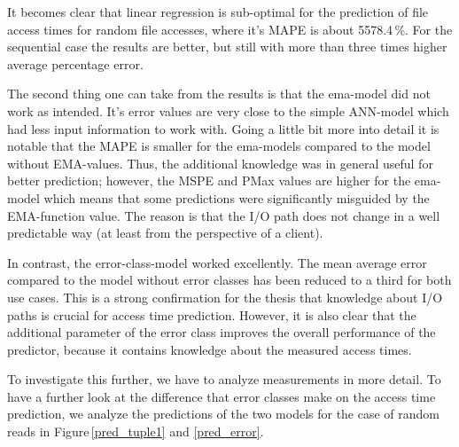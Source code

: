 \documentclass{superfri}
\begin{document}
	It becomes clear that linear regression is sub-optimal for the prediction of file access times for random file accesses, where it's MAPE is about 5578.4\,\%. For the sequential case the results are better, but still with more than three times higher average percentage error.\medskip
	
	The second thing one can take from the results is that the ema-model did not work as intended.
	It's error values are very close to the simple ANN-model which had less input information to work with.
	Going a little bit more into detail it is notable that the MAPE is smaller for the ema-models compared to the model without EMA-values.
	Thus, the additional knowledge was in general useful for better prediction; however, the MSPE and PMax values are higher for the ema-model which means that some predictions were significantly misguided by the EMA-function value.
	The reason is that the I/O path does not change in a well predictable way (at least from the perspective of a client).
	\medskip
	
	In contrast, the error-class-model worked excellently. The mean average error compared to the model without error classes has been reduced to a third for both use cases.
	This is a strong confirmation for the thesis that knowledge about I/O paths is crucial for access time prediction.
	However, it is also clear that the additional parameter of the error class improves the overall performance of the predictor, because it contains knowledge about the measured access times.
	
	\medskip
	
	To investigate this further, we have to analyze measurements in more detail.
	To have a further look at the difference that error classes make on the access time prediction, we analyze the predictions of the two models for the case of random reads in Figure\,\ref{pred_tuple1} and \ref{pred_error}.
\end{document}
